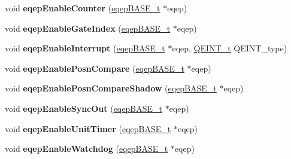 \begin{DoxyCompactItemize}
void {\bfseries eqep\+Enable\+Counter} (\mbox{\hyperlink{reg__eqep_8h_a794db63555812863c39c5d214fd4f215}{eqep\+B\+A\+S\+E\+\_\+t}} $\ast$eqep)
\item 
\mbox{\label{group__eQEP_ga6b03f1112ec3af645ef5d42a9aff48ee}} 
void {\bfseries eqep\+Enable\+Gate\+Index} (\mbox{\hyperlink{reg__eqep_8h_a794db63555812863c39c5d214fd4f215}{eqep\+B\+A\+S\+E\+\_\+t}} $\ast$eqep)
\item 
\mbox{\label{group__eQEP_gad3967274031cc14efd6581d221cc17b5}} 
void {\bfseries eqep\+Enable\+Interrupt} (\mbox{\hyperlink{reg__eqep_8h_a794db63555812863c39c5d214fd4f215}{eqep\+B\+A\+S\+E\+\_\+t}} $\ast$eqep, \mbox{\hyperlink{eqep_8h_af85f2f99be537503acd2fddf67e63caf}{Q\+E\+I\+N\+T\+\_\+t}} Q\+E\+I\+N\+T\+\_\+type)
\item 
\mbox{\label{group__eQEP_ga816249b0c03ab621470c4825ef29ea4c}} 
void {\bfseries eqep\+Enable\+Posn\+Compare} (\mbox{\hyperlink{reg__eqep_8h_a794db63555812863c39c5d214fd4f215}{eqep\+B\+A\+S\+E\+\_\+t}} $\ast$eqep)
\item 
\mbox{\label{group__eQEP_gab4798d8edd3ed7a0a51f2bc0de0d5cf6}} 
void {\bfseries eqep\+Enable\+Posn\+Compare\+Shadow} (\mbox{\hyperlink{reg__eqep_8h_a794db63555812863c39c5d214fd4f215}{eqep\+B\+A\+S\+E\+\_\+t}} $\ast$eqep)
\item 
\mbox{\label{group__eQEP_ga0183fc7ae10857bea95acbd6eaafb15e}} 
void {\bfseries eqep\+Enable\+Sync\+Out} (\mbox{\hyperlink{reg__eqep_8h_a794db63555812863c39c5d214fd4f215}{eqep\+B\+A\+S\+E\+\_\+t}} $\ast$eqep)
\item 
\mbox{\label{group__eQEP_ga5bb9d5e1ce5db91062a2f8d4a9202003}} 
void {\bfseries eqep\+Enable\+Unit\+Timer} (\mbox{\hyperlink{reg__eqep_8h_a794db63555812863c39c5d214fd4f215}{eqep\+B\+A\+S\+E\+\_\+t}} $\ast$eqep)
\item 
\mbox{\label{group__eQEP_ga0cb54114d51314f1faf607845be9eeb1}} 
void {\bfseries eqep\+Enable\+Watchdog} (\mbox{\hyperlink{reg__eqep_8h_a794db63555812863c39c5d214fd4f215}{eqep\+B\+A\+S\+E\+\_\+t}} $\ast$eqep)
\item 
\mbox{\label{group__eQEP_gadb815c82e3cfb138d88a62ed9296118a}} 

\end{DoxyCompactItemize}
